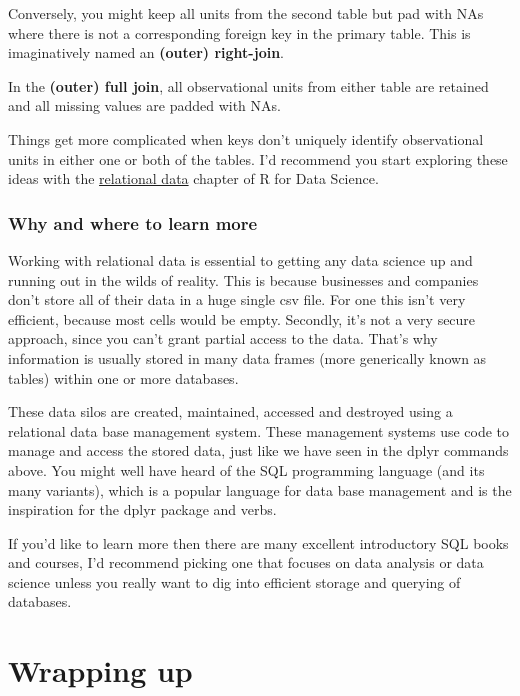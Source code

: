 \documentclass[
  12pt,
]{book}
\begin{document}
Conversely, you might keep all units from the second table but pad with NAs where there is not a corresponding foreign key in the primary table. This is imaginatively named an \textbf{(outer) right-join}.

In the \textbf{(outer) full join}, all observational units from either table are retained and all missing values are padded with NAs.

Things get more complicated when keys don't uniquely identify observational units in either one or both of the tables. I'd recommend you start exploring these ideas with the \href{https://r4ds.had.co.nz/relational-data.html}{relational data} chapter of R for Data Science.

\hypertarget{why-and-where-to-learn-more}{%
\subsubsection{Why and where to learn more}\label{why-and-where-to-learn-more}}

Working with relational data is essential to getting any data science up and running out in the wilds of reality. This is because businesses and companies don't store all of their data in a huge single csv file. For one this isn't very efficient, because most cells would be empty. Secondly, it's not a very secure approach, since you can't grant partial access to the data. That's why information is usually stored in many data frames (more generically known as tables) within one or more databases.

These data silos are created, maintained, accessed and destroyed using a relational data base management system. These management systems use code to manage and access the stored data, just like we have seen in the dplyr commands above. You might well have heard of the SQL programming language (and its many variants), which is a popular language for data base management and is the inspiration for the dplyr package and verbs.

If you'd like to learn more then there are many excellent introductory SQL books and courses, I'd recommend picking one that focuses on data analysis or data science unless you really want to dig into efficient storage and querying of databases.

\hypertarget{wrapping-up-3}{%
\section{Wrapping up}\label{wrapping-up-3}}
\end{document}
